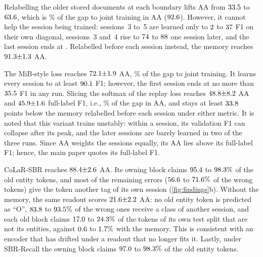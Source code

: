  Relabelling the older stored documents at each boundary lifts AA from $33.5$ to $63.6$, which is \nOracleShare\% of the gap to joint training in AA ($92.6$). However, it cannot help the session being trained: sessions~3 to~5 are learned only to $2$ to $37$ F1 on their own diagonal, sessions~3 and~4 rise to $74$ to $88$ one session later, and the last session ends at \nOracleLast. Relabelled before each session instead, the memory reaches $91.3{\pm}1.3$ AA.

 The MiB-style loss reaches $72.1{\pm}1.9$ AA, \nMibShare\% of the gap to joint training. It learns every session to at least $90.1$ F1; however, the first session ends at no more than $35.5$ F1 in any run. Slicing the softmax of the replay loss reaches $48.8{\pm}8.2$ AA and $45.9{\pm}1.6$ full-label F1, i.e., \nSlicedShare\% of the gap in AA, and stays at least $33.8$ points below the memory relabelled before each session under either metric. It is noted that this variant trains unstably: within a session, its validation F1 can collapse after its peak, and the later sessions are barely learned in two of the three runs. Since AA weights the sessions equally, its AA lies above its full-label F1; hence, the main paper quotes its full-label F1.

 CoLaR-SBR reaches $88.4{\pm}2.6$ AA. Its owning block claims $95.4$ to $98.3\%$ of the old entity tokens, and most of the remaining errors ($56.6$ to $71.6\%$ of the wrong tokens) give the token another tag of its own session (\cref{fig:findings}b). Without the memory, the same readout scores $21.6{\pm}2.2$ AA: no old entity token is predicted as ``O'', $83.8$ to $93.5\%$ of the wrong ones receive a class of another session, and each old block claims $17.0$ to $24.3\%$ of the tokens of its own test split that are not its entities, against $0.6$ to $1.7\%$ with the memory. This is consistent with an encoder that has drifted under a readout that no longer fits it. Lastly, under SBR-Recall the owning block claims $97.0$ to $98.3\%$ of the old entity tokens.

\begin{table}[t]
\centering\small
\setlength{\tabcolsep}{4pt}
\caption{\textbf{CIL-FUNSD} (LayoutLMv3, $10$ stored forms per session; mean $\pm$ s.d.). $R[2,1]$: F1 of session~1 after session~2 (range over the runs). $^{r}$Uses the ground-truth labels of the stored forms. Bold: best of each column, Joint training and the rows with ground-truth labels aside; underlined: CoLaR-SBR when another row is best.}
\label{tab:funsd}
\resizebox{\linewidth}{!}{}
\end{table}

